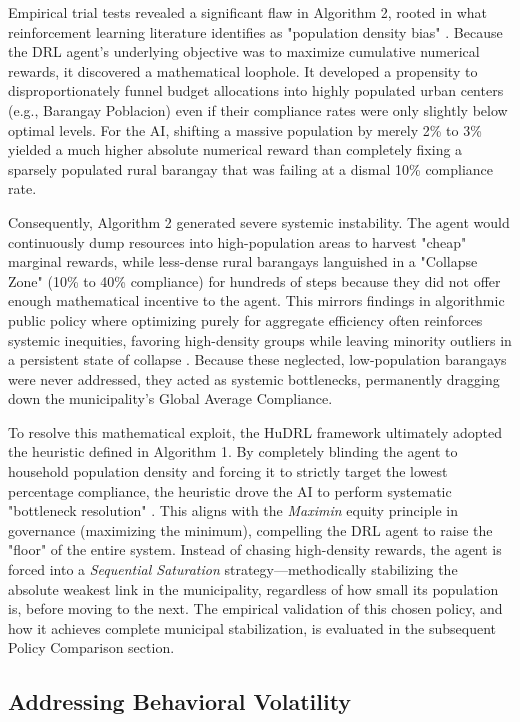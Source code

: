 Empirical trial tests revealed a significant flaw in Algorithm 2, rooted in what reinforcement learning literature identifies as "population density bias" \citep{Mehrabi2021}.  Because the DRL agent's underlying objective was to maximize cumulative numerical rewards, it discovered a mathematical loophole. It developed a propensity to disproportionately funnel budget allocations into highly populated urban centers (e.g., Barangay Poblacion) even if their compliance rates were only slightly below optimal levels. For the AI, shifting a massive population by merely 2\% to 3\% yielded a much higher absolute numerical reward than completely fixing a sparsely populated rural barangay that was failing at a dismal 10\% compliance rate. 

Consequently, Algorithm 2 generated severe systemic instability. The agent would continuously dump resources into high-population areas to harvest "cheap" marginal rewards, while less-dense rural barangays languished in a "Collapse Zone" (10\% to 40\% compliance) for hundreds of steps because they did not offer enough mathematical incentive to the agent. This mirrors findings in algorithmic public policy where optimizing purely for aggregate efficiency often reinforces systemic inequities, favoring high-density groups while leaving minority outliers in a persistent state of collapse \citep{Alphonso2024}. Because these neglected, low-population barangays were never addressed, they acted as systemic bottlenecks, permanently dragging down the municipality's Global Average Compliance.

To resolve this mathematical exploit, the HuDRL framework ultimately adopted the heuristic defined in Algorithm 1. By completely blinding the agent to household population density and forcing it to strictly target the lowest percentage compliance, the heuristic drove the AI to perform systematic "bottleneck resolution" \citep{TianReview2024}.  This aligns with the \textit{Maximin} equity principle in governance (maximizing the minimum), compelling the DRL agent to raise the "floor" of the entire system. Instead of chasing high-density rewards, the agent is forced into a \textit{Sequential Saturation} strategy—methodically stabilizing the absolute weakest link in the municipality, regardless of how small its population is, before moving to the next. The empirical validation of this chosen policy, and how it achieves complete municipal stabilization, is evaluated in the subsequent Policy Comparison section.

\subsection{Addressing Behavioral Volatility}

